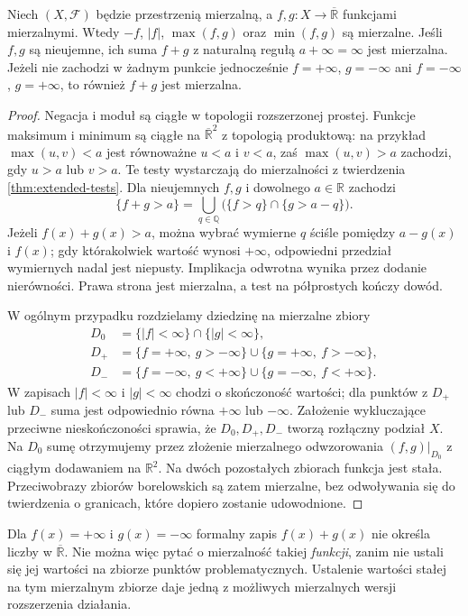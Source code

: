 \begin{twierdzenie}
\label{thm:extended-operations}
Niech $(X,\mathcal F)$ będzie przestrzenią mierzalną,
a $f,g:X\to\overline{\mathbb R}$ funkcjami mierzalnymi.
Wtedy $-f$, $|f|$, $\max(f,g)$ oraz $\min(f,g)$
są mierzalne. Jeśli $f,g$ są nieujemne, ich suma
$f+g$ z naturalną regułą $a+\infty=\infty$
jest mierzalna. Jeżeli nie zachodzi w żadnym punkcie
jednocześnie $f=+\infty$, $g=-\infty$ ani
$f=-\infty$, $g=+\infty$, to również $f+g$ jest mierzalna.
\end{twierdzenie}
\begin{proof}
Negacja i moduł są ciągłe w topologii rozszerzonej
prostej. Funkcje maksimum i minimum są ciągłe na
$\overline{\mathbb R}^2$ z topologią produktową:
na przykład $\max(u,v)<a$ jest równoważne
$u<a$ i $v<a$, zaś $\max(u,v)>a$ zachodzi,
gdy $u>a$ lub $v>a$. Te testy wystarczają do
mierzalności z twierdzenia \ref{thm:extended-tests}.
Dla nieujemnych $f,g$ i dowolnego $a\in\mathbb R$
zachodzi
\[
\{f+g>a\}=\bigcup_{q\in\mathbb Q}
\bigl(\{f>q\}\cap\{g>a-q\}\bigr).
\]
Jeżeli $f(x)+g(x)>a$, można wybrać wymierne $q$
ściśle pomiędzy $a-g(x)$ i $f(x)$; gdy którakolwiek
wartość wynosi $+\infty$, odpowiedni przedział
wymiernych nadal jest niepusty. Implikacja odwrotna
wynika przez dodanie nierówności. Prawa strona
jest mierzalna, a test na półprostych kończy dowód.

W ogólnym przypadku rozdzielamy dziedzinę na mierzalne
zbiory
\[
\begin{aligned}
D_0&=\{|f|<\infty\}\cap\{|g|<\infty\},\\
D_+&=\{f=+\infty,\ g>-\infty\}
      \cup\{g=+\infty,\ f>-\infty\},\\
D_-&=\{f=-\infty,\ g<+\infty\}
      \cup\{g=-\infty,\ f<+\infty\}.
\end{aligned}
\]
W zapisach $|f|<\infty$ i $|g|<\infty$ chodzi o
skończoność wartości; dla punktów z $D_+$ lub $D_-$
suma jest odpowiednio równa $+\infty$ lub $-\infty$.
Założenie wykluczające przeciwne nieskończoności
sprawia, że $D_0,D_+,D_-$ tworzą rozłączny podział
$X$. Na $D_0$ sumę otrzymujemy przez złożenie
mierzalnego odwzorowania $(f,g)|_{D_0}$ z ciągłym
dodawaniem na $\mathbb R^2$. Na dwóch pozostałych
zbiorach funkcja jest stała. Przeciwobrazy
zbiorów borelowskich są zatem mierzalne, bez
odwoływania się do twierdzenia o granicach,
które dopiero zostanie udowodnione.
\end{proof}

\begin{uwaga}
Dla $f(x)=+\infty$ i $g(x)=-\infty$ formalny zapis
$f(x)+g(x)$ nie określa liczby w $\overline{\mathbb R}$.
Nie można więc pytać o mierzalność takiej \emph{funkcji},
zanim nie ustali się jej wartości na zbiorze punktów
problematycznych. Ustalenie wartości stałej na tym
mierzalnym zbiorze daje jedną z możliwych mierzalnych
wersji rozszerzenia działania.
\end{uwaga}

